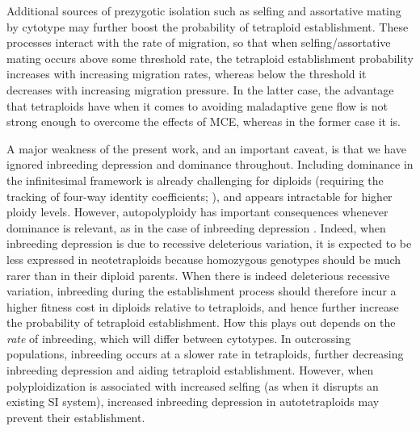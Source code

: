 \documentclass[12pt,a4paper]{article}
\begin{document}
Additional sources of prezygotic isolation such as selfing and assortative
mating by cytotype may further boost the probability of tetraploid
establishment.
These processes interact with the rate of migration, so that when
selfing/assortative mating occurs above some threshold rate, the tetraploid
establishment probability increases with increasing migration rates, whereas
below the threshold it decreases with increasing migration pressure.
In the latter case, the advantage that tetraploids have when it comes to
avoiding maladaptive gene flow is not strong enough to overcome the effects of
MCE, whereas in the former case it is.

A major weakness of the present work, and an important caveat, is that we have
ignored inbreeding depression and dominance throughout.
Including dominance in the infinitesimal framework is already challenging for
diploids (requiring the tracking of four-way identity coefficients;
\cite{barton2023}), and appears intractable for higher ploidy levels.
However, autopolyploidy has important consequences whenever dominance is
relevant, as in the case of inbreeding depression \citep{ronfort1999}.
Indeed, when inbreeding depression is due to recessive deleterious variation,
it is expected to be less expressed in neotetraploids because homozygous genotypes
should be much rarer than in their diploid parents.
When there is indeed deleterious recessive variation, inbreeding during the
establishment process should therefore incur a higher fitness cost in diploids
relative to tetraploids, and hence further increase the probability of
tetraploid establishment.
How this plays out depends on the \textit{rate} of inbreeding, which will
differ between cytotypes. 
In outcrossing populations, inbreeding occurs at a slower rate in tetraploids,
further decreasing inbreeding depression and aiding tetraploid establishment.
However, when polyploidization is associated with increased selfing (as when it
disrupts an existing SI system), increased inbreeding depression in
autotetraploids may prevent their establishment. 
\end{document}
